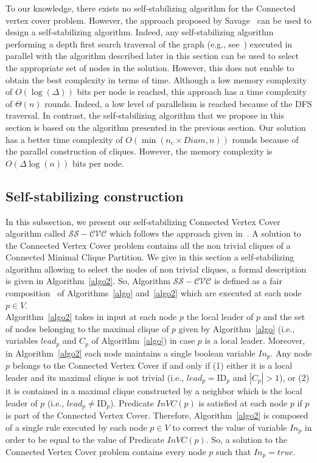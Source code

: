 \documentclass[11pt,letterpaper,onecolumn]{article}
\newcommand{\id}{\mbox{ID}}
\begin{document}
To our knowledge, there exists no self-stabilizing algorithm for the Connected vertex cover problem. However, the approach proposed by Savage~\cite{Savage82} can be used to design a self-stabilizing algorithm. Indeed, any self-stabilizing algorithm performing a depth first search traversal of the graph (e.g., see~\cite{CollinD94,CournierDPV06,PetitV07}) executed in parallel with the algorithm described later in this section can be used to select the appropriate set of nodes in the solution. However, this does not enable to obtain the best complexity in terms of time. Although a low memory complexity of $O(\log(\Delta))$ bits per node is reached, this approach has a time complexity of $\Theta(n)$ rounds. Indeed, a low level of parallelism is reached because of the DFS traversal. In contrast, the self-stabilizing algorithm that we propose in this section is based on the algorithm presented in the previous section. Our solution has a better time complexity of $O(\min(n_c \times Diam,n))$ rounds because of the parallel construction of cliques. However, the memory complexity is $O(\Delta \log(n))$ bits per node.

\subsection{Self-stabilizing construction}

In this subsection, we present our self-stabilizing Connected Vertex Cover algorithm called $\mathcal{SS-CVC}$ which follows the approach given in~\cite{DelbotLP13}. A solution to the Connected Vertex Cover problem contains all the non trivial cliques of a Connected Minimal Clique Partition. We give in this section a self-stabilizing algorithm allowing to select the nodes of non trivial cliques, a formal description is given in Algorithm~\ref{algo2}. So, Algorithm $\mathcal{SS-CVC}$ is defined as a fair composition~\cite{Dolev2000} of Algorithms~\ref{algo} and~\ref{algo2} which are executed at each node $p \in V$.\\
Algorithm~\ref{algo2} takes in input at each node $p$ the local leader of $p$ and the set of nodes belonging to the maximal clique of $p$ given by Algorithm~\ref{algo} (i.e., variables $lead_p$ and $C_p$ of Algorithm~\ref{algo}) in case $p$ is a local leader. Moreover, in Algorithm~\ref{algo2} each node maintains a single boolean variable $In_p$. Any node $p$ belongs to the Connected Vertex Cover if and only if (1) either it is a local leader and its maximal clique is not trivial (i.e., $lead_p=\id_p$ and $|C_p|>1$), or (2) it is contained in a maximal clique constructed by a neighbor which is the local leader of $p$ (i.e., $lead_p \neq \id_p$). Predicate $InVC(p)$ is satisfied at each node $p$ if $p$ is part of the Connected Vertex Cover. Therefore, Algorithm~\ref{algo2} is composed of a single rule executed by each node $p \in V$ to correct the value of variable $In_p$ in order to be equal to the value of Predicate $InVC(p)$. So, a solution to the Connected Vertex Cover problem contains every node $p$ such that $In_p=true$.
\end{document}
